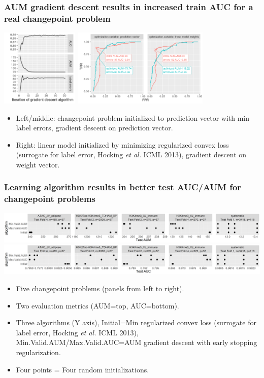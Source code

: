 \documentclass{beamer}
\begin{document}
\begin{frame}
  \frametitle{AUM gradient descent results in increased train AUC for
    a real changepoint problem}

\includegraphics[height=3.7cm]{figure-aum-optimized-iterations.png}
\includegraphics[height=3.7cm]{figure-aum-train-both.png}

\begin{itemize}
\item Left/middle: changepoint problem initialized to prediction vector with
  min label errors, gradient descent on prediction vector.
\item Right: linear model initialized by minimizing regularized convex
  loss (surrogate for label error, Hocking \emph{et al.} ICML 2013),
  gradient descent on weight vector.
\end{itemize}

\end{frame}

\begin{frame}
  \frametitle{Learning algorithm results in better test AUC/AUM for changepoint problems}
    
\includegraphics[width=\textwidth]{figure-test-aum-comparison.png}
\includegraphics[width=\textwidth]{figure-test-auc-comparison.png}

\begin{itemize}
\item Five changepoint problems (panels from left to right).
\item Two evaluation metrics (AUM=top, AUC=bottom).
\item Three algorithms (Y axis), Initial=Min regularized convex loss
  (surrogate for label error, Hocking \emph{et al.} ICML 2013), Min.Valid.AUM/Max.Valid.AUC=AUM
  gradient descent with early stopping regularization.
\item Four points = Four random initializations.
\end{itemize}

\end{frame}
\end{document}
